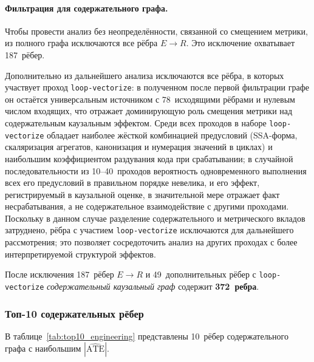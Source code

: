 \paragraph{Фильтрация для содержательного графа.}
Чтобы провести анализ без неопределённости, связанной со смещением метрики, из полного графа исключаются все рёбра $E \to R$. Это исключение охватывает 187~рёбер.

Дополнительно из дальнейшего анализа исключаются все рёбра, в которых участвует проход \texttt{loop-\allowbreak vectorize}: в полученном после первой фильтрации графе он остаётся универсальным источником с 78~исходящими рёбрами и нулевым числом входящих, что отражает доминирующую роль смещения метрики над содержательным каузальным эффектом. Среди всех проходов в наборе \texttt{loop-\allowbreak vectorize} обладает наиболее жёсткой комбинацией предусловий (SSA-форма, скаляризация агрегатов, канонизация и нумерация значений в циклах) и наибольшим коэффициентом раздувания кода при срабатывании; в случайной последовательности из 10--40~проходов вероятность одновременного выполнения всех его предусловий в правильном порядке невелика, и его эффект, регистрируемый в каузальной оценке, в значительной мере отражает факт несрабатывания, а не содержательное взаимодействие с другими проходами. Поскольку в данном случае разделение содержательного и метрического вкладов затруднено, рёбра с участием \texttt{loop-\allowbreak vectorize} исключаются для дальнейшего рассмотрения; это позволяет сосредоточить анализ на других проходах с более интерпретируемой структурой эффектов.

После исключения 187~рёбер $E \to R$ и 49~дополнительных рёбер с \texttt{loop-\allowbreak vectorize} \emph{содержательный каузальный граф} содержит \textbf{372~ребра}.

\subsubsection{Топ-10 содержательных рёбер}

В таблице~\ref{tab:top10_engineering} представлены 10~рёбер содержательного графа с наибольшим $|\widehat{\text{ATE}}|$.


